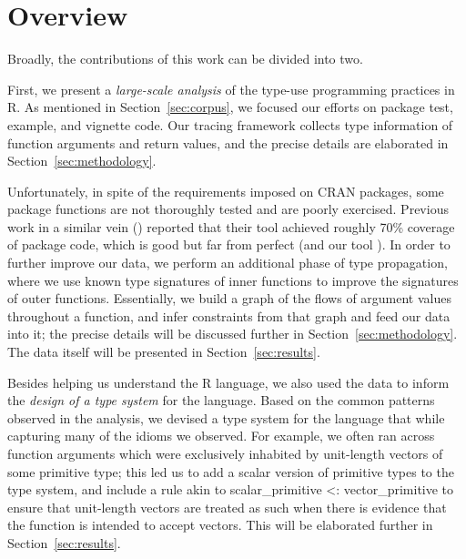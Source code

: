 \documentclass[sigplan,10pt,review,anonymous]{acmart}\settopmatter{printfolios=true,printccs=false,printacmref=false}
\begin{document}

%
%
%
%
%
%
\section{Overview}


Broadly, the contributions of this work can be divided into two.

First, we present a {\it large-scale analysis} of the type-use programming practices in R.
As mentioned in Section~\ref{sec:corpus}, we focused our efforts on package test, example, and vignette code.
Our tracing framework collects type information of function arguments and return values, and the precise details are elaborated in Section~\ref{sec:methodology}.

Unfortunately, in spite of the requirements imposed on CRAN packages, some package functions are not thoroughly tested and are poorly exercised.
Previous work in a similar vein () reported that their tool achieved roughly 70\% coverage of package code, which is good but far from perfect (and our tool ).
In order to further improve our data, we perform an additional phase of type propagation, where we use known type signatures of inner functions to improve the signatures of outer functions.
Essentially, we build a graph of the flows of argument values throughout a function, and infer constraints from that graph and feed our data into it; the precise details will be discussed further in Section~\ref{sec:methodology}.
The data itself will be presented in Section~\ref{sec:results}.

Besides helping us understand the R language, we also used the data to inform the {\it design of a type system} for the language.
Based on the common patterns observed in the analysis, we devised a type system for the language that  while capturing many of the idioms we observed.
For example, we often ran across function arguments which were exclusively inhabited by unit-length vectors of some primitive type; this led us to add a scalar version of primitive types to the type system, and include a rule akin to scalar\_primitive <: vector\_primitive to ensure that unit-length vectors are treated as such when there is evidence that the function is intended to accept vectors.
This will be elaborated further in Section~\ref{sec:results}. 
\end{document}
